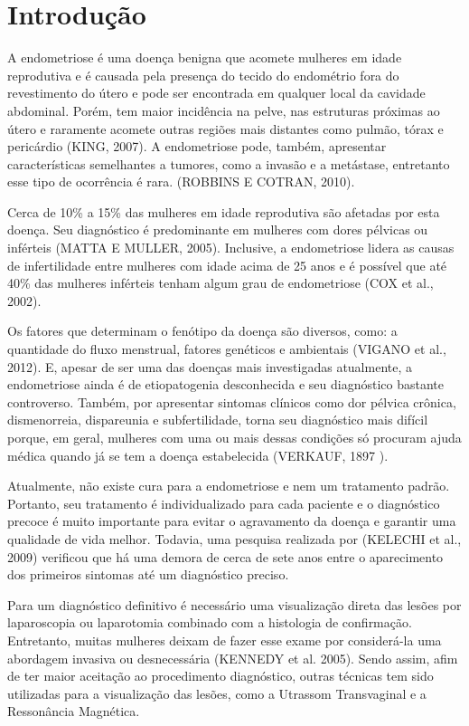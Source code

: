 \documentclass[12pt]{article} %
\begin{document}
\newpage


\section{Introdução}

A endometriose é uma doença benigna que acomete mulheres em idade
reprodutiva e é causada pela presença do tecido do endométrio fora do
revestimento do útero e pode ser encontrada em qualquer local da
cavidade abdominal. Porém, tem maior incidência na pelve, nas
estruturas próximas ao útero e raramente acomete outras regiões mais
distantes como pulmão, tórax e pericárdio (KING, 2007). A endometriose
pode, também, apresentar características semelhantes a tumores, como a
invasão e a metástase, entretanto esse tipo de ocorrência é
rara. (ROBBINS E COTRAN, 2010).

Cerca de 10\% a 15\% das mulheres em idade reprodutiva são afetadas
por esta doença. Seu diagnóstico é predominante em mulheres com dores
pélvicas ou inférteis (MATTA E MULLER, 2005).  Inclusive, a
endometriose lidera as causas de infertilidade entre mulheres com
idade acima de 25 anos e é possível que até 40\%
das mulheres inférteis tenham algum grau de endometriose (COX et al., 2002).

Os fatores que determinam o fenótipo da doença são diversos, como: a
quantidade do fluxo menstrual, fatores genéticos e ambientais (VIGANO
et al., 2012). E, apesar de ser uma das doenças mais investigadas
atualmente, a endometriose ainda é de etiopatogenia desconhecida e seu
diagnóstico bastante controverso. Também, por apresentar sintomas
clínicos como dor pélvica crônica, dismenorreia, dispareunia e
subfertilidade, torna seu diagnóstico mais difícil porque, em geral,
mulheres com uma ou mais dessas condições só procuram ajuda médica
quando já se tem a doença estabelecida (VERKAUF, 1897 ). 

Atualmente, não existe cura para a endometriose e nem um tratamento
padrão. Portanto, seu tratamento é individualizado para cada paciente
e o diagnóstico precoce é muito importante para evitar o agravamento
da doença e garantir uma qualidade de vida melhor.  Todavia, uma
pesquisa realizada por (KELECHI et al., 2009) verificou que há uma
demora de cerca de sete anos entre o aparecimento dos primeiros
sintomas até um diagnóstico preciso.

Para um diagnóstico definitivo é necessário uma visualização direta
das lesões por laparoscopia ou laparotomia combinado com a histologia
de confirmação. Entretanto, muitas mulheres deixam de fazer esse exame
por considerá-la uma abordagem invasiva ou desnecessária (KENNEDY et al. 2005).  Sendo assim, afim de ter maior aceitação ao procedimento
diagnóstico, outras técnicas tem sido utilizadas para a visualização
das lesões, como a Utrassom Transvaginal e a Ressonância Magnética.
\end{document}

